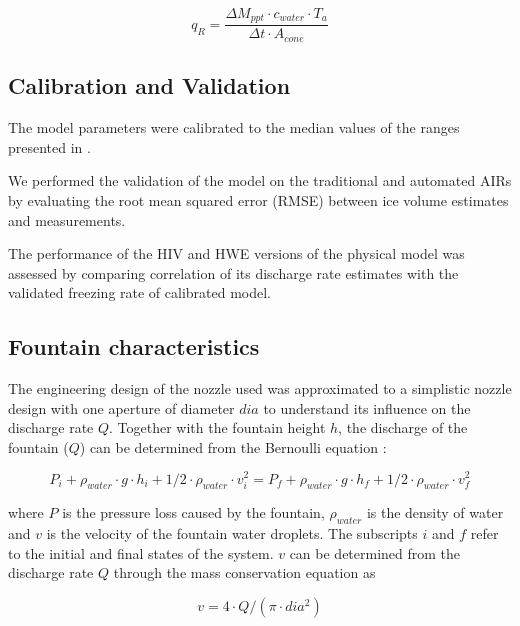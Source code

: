 \documentclass[tc, manuscript]{copernicus}
\begin{document}
\begin{equation}
  q_{R} = \frac{\Delta M_{ppt} \cdot c_{water} \cdot T_{a}}{\Delta t \cdot A_{cone}}
\end{equation}

\subsection{Calibration and Validation}

The model parameters were calibrated to the median values of the ranges presented in
\cite{balasubramanianInfluenceMeteorologicalConditions2022}.

We performed the validation of the model on the traditional and automated AIRs by evaluating the root mean
squared error (RMSE) between ice volume estimates and measurements. 

The performance of the HIV and HWE versions of the physical model was assessed by comparing correlation of its
discharge rate estimates with the validated freezing rate of calibrated model.

\subsection{Fountain characteristics}

The engineering design of the nozzle used was approximated to a simplistic nozzle design with one aperture of
diameter $dia$ to understand its influence on the discharge rate $Q$. Together with the fountain height $h$,
the discharge of the fountain ($Q$) can be determined from the Bernoulli equation :

\begin{equation}
  \label{eqn:fountain}
  P_{i} + \rho_{water} \cdot g \cdot h_{i} + 1/2 \cdot \rho_{water} \cdot v_{i}^2 = P_{f} + \rho_{water} \cdot g
  \cdot h_{f} + 1/2 \cdot \rho_{water} \cdot v_{f}^2
\end{equation}

where $P$ is the pressure loss caused by the fountain, $\rho_{water}$ is the density of water and $v$ is the
velocity of the fountain water droplets. The subscripts $i$ and $f$ refer to the initial and final states of the
system. $v$ can be determined from the discharge rate $Q$ through the mass conservation equation as 

\begin{equation}
	\label{eqn:dis}
 v = 4 \cdot Q/(\pi \cdot dia^2)
\end{equation}
\end{document}
